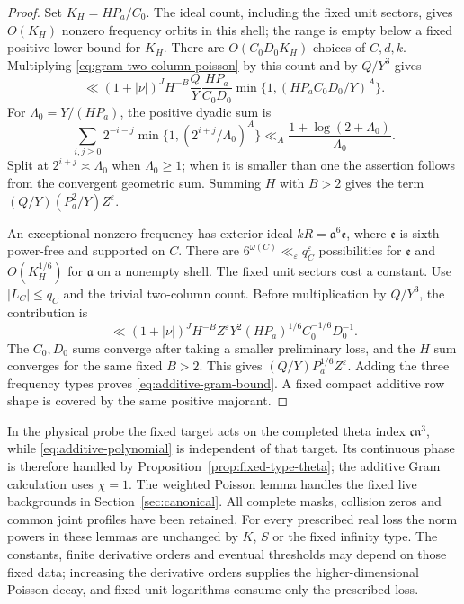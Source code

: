 \documentclass[11pt,a4paper]{article}
\numberwithin{equation}{section}
\theoremstyle{definition}
\theoremstyle{remark}
\newcommand{\eps}{\varepsilon}
\begin{document}
\begin{proof}
Set $K_H=HP_a/C_0$.  The ideal count, including the fixed unit sectors,
gives $O(K_H)$ nonzero frequency orbits in this shell; the range is
empty below a fixed positive lower bound for $K_H$.
There are $O(C_0D_0K_H)$ choices of $C,d,k$.  Multiplying
\eqref{eq:gram-two-column-poisson} by this count and by $Q/Y^3$ gives
\[
 \ll(1+|\nu|)^JH^{-B}\frac QY
       \frac{HP_a}{C_0D_0}
       \min\{1,(HP_aC_0D_0/Y)^A\}.
\]
For $\Lambda_0=Y/(HP_a)$, the positive dyadic sum is
\[
 \sum_{i,j\ge0}2^{-i-j}
       \min\{1,(2^{i+j}/\Lambda_0)^A\}
 \ll_A\frac{1+\log(2+\Lambda_0)}{\Lambda_0}.
\]
Split at $2^{i+j}\asymp\Lambda_0$ when $\Lambda_0\ge1$; when it is
smaller than one the assertion follows from the convergent geometric
sum.  Summing $H$ with $B>2$ gives the term
$(Q/Y)(P_a^2/Y)Z^\eps$.

An exceptional nonzero frequency has exterior ideal
$kR=\mathfrak a^6\mathfrak e$, where $\mathfrak e$ is sixth-power-free
and supported on $C$.  There are
$6^{\omega(C)}\ll_\eps q_C^\eps$ possibilities for $\mathfrak e$ and
$O(K_H^{1/6})$ for $\mathfrak a$ on a nonempty shell.  The fixed unit
sectors cost a constant.  Use $|L_C|\le q_C$ and the trivial
two-column count.  Before multiplication by $Q/Y^3$, the contribution is
\[
 \ll(1+|\nu|)^JH^{-B}Z^\eps
       Y^2(HP_a)^{1/6}C_0^{-1/6}D_0^{-1}.
\]
The $C_0,D_0$ sums converge after taking a smaller preliminary loss,
and the $H$ sum converges for the same fixed $B>2$.  This gives
$(Q/Y)P_a^{1/6}Z^\eps$.  Adding the three frequency types proves
\eqref{eq:additive-gram-bound}.  A fixed compact additive row shape is
covered by the same positive majorant.
\end{proof}

In the physical probe the fixed target acts on the completed theta
index $\mathfrak c\mathfrak n^3$, while
\eqref{eq:additive-polynomial} is independent of that target.
Its continuous phase is therefore handled by
Proposition~\ref{prop:fixed-type-theta}; the additive Gram calculation
uses $\chi=1$.  The weighted Poisson lemma handles the fixed live
backgrounds in Section~\ref{sec:canonical}.
All complete masks, collision zeros and common joint profiles have been
retained.  For every prescribed real loss the norm powers in these
lemmas are unchanged by $K$, $S$ or the fixed infinity type.  The
constants, finite derivative orders and eventual thresholds may depend
on those fixed data; increasing the derivative orders supplies the
higher-dimensional Poisson decay, and fixed unit logarithms consume
only the prescribed loss.
\end{document}
